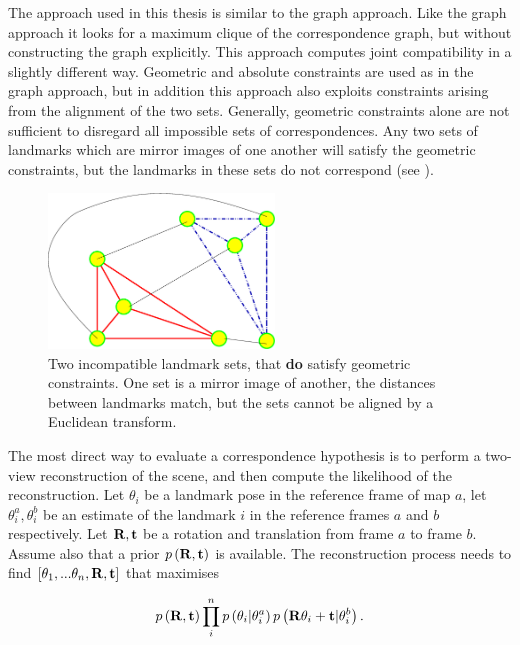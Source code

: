 The approach used in this thesis is similar to the graph approach.
Like the graph approach it looks for a maximum clique of the
correspondence graph, but without constructing the graph explicitly.
This approach computes joint compatibility in a slightly different
way. Geometric and absolute constraints are used as in the graph
approach, but in addition this approach also exploits constraints
arising from the alignment of the two sets. Generally, geometric
constraints alone are not sufficient to disregard all impossible sets
of correspondences. Any two sets of landmarks which are mirror images
of one another will satisfy the geometric constraints, but the
landmarks in these sets do not correspond (see
).

\begin{figure}[htbp]
  \centering
  \includegraphics[width=6cm]{Pics/fig_mirror_sets}
  \caption[Reflection and alignment]{Two incompatible landmark sets, that {\bf do} satisfy
    geometric constraints. One set is a mirror image of another, the
    distances between landmarks match, but the sets cannot be aligned
    by a Euclidean transform.
}
  \label{fig:mirror_sets}
\end{figure}

The most direct way to evaluate a correspondence hypothesis is to
perform a two-view reconstruction of the scene, and then compute the
likelihood of the reconstruction. Let $\theta_i$ be a landmark
pose in the reference frame of map $a$, let $\theta_i^a, \theta_i^b$
be an estimate of the landmark $i$ in the reference frames $a$ and
$b$ respectively. Let ${\bf R},{\bf t}$ be a rotation and translation
from frame $a$ to frame $b$. Assume also that a prior $p\left({\bf
R},{\bf t}\right)$ is available. The reconstruction process needs to
find $\left[\theta_1,...\theta_n, {\bf R},{\bf t}\right]$ that
maximises

\begin{equation}
p\left({\bf R},{\bf t}\right)
\prod_{i}^n p\left(\theta_i | \theta_i^a\right)
p\left({\bf R}\theta_i + {\bf t} | \theta_i^b\right).
\label{eqn:align}
\end{equation}

